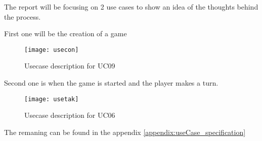 The report will be focusing on 2 use cases to show an idea of the thoughts
 behind the process.\clearpage

First one will be the creation of a game\\

\begin{figure}[h]
\centering
\texttt{[image: usecon]}
\caption{Usecase description for UC09}
\end{figure}
\clearpage

Second one is when the game is started and the player makes a turn.\\

\begin{figure}[h]
\centering
\texttt{[image: usetak]}
\caption{Usecase description for UC06}
\end{figure}
The remaning can be found in the appendix \ref{appendix:useCase_specification}

